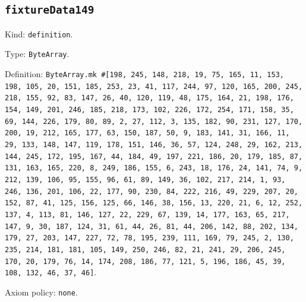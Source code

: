 \documentclass[11pt]{article}
\begin{document}
\subsection*{\texttt{fixtureData149}}
\noindent Kind: \texttt{definition}.\par
\noindent Type: \texttt{ByteArray}.\par
\noindent Definition: \texttt{ByteArray.mk \#[198, 245, 148, 218, 19, 75, 165, 11, 153, 198, 105, 20, 151, 185, 253, 23, 41, 117, 244, 97, 120, 165, 200, 245, 218, 155, 92, 83, 147, 26, 40, 120, 119, 48, 175, 164, 21, 198, 176, 154, 149, 201, 246, 185, 218, 173, 102, 226, 172, 254, 171, 158, 35, 69, 144, 226, 179, 80, 89, 2, 27, 112, 3, 135, 182, 90, 231, 127, 170, 200, 19, 212, 165, 177, 63, 150, 187, 50, 9, 183, 141, 31, 166, 11, 29, 133, 148, 147, 119, 178, 151, 146, 36, 57, 124, 248, 29, 162, 213, 144, 245, 172, 195, 167, 44, 184, 49, 197, 221, 186, 20, 179, 185, 87, 131, 163, 165, 220, 8, 249, 186, 155, 6, 243, 18, 176, 24, 141, 74, 9, 212, 139, 106, 95, 155, 96, 61, 89, 149, 36, 102, 217, 214, 1, 93, 246, 136, 201, 106, 22, 177, 90, 230, 84, 222, 216, 49, 229, 207, 20, 152, 87, 41, 125, 156, 125, 66, 146, 38, 156, 13, 220, 21, 6, 12, 252, 137, 4, 113, 81, 146, 127, 22, 229, 67, 139, 14, 177, 163, 65, 217, 147, 9, 30, 187, 124, 31, 61, 44, 26, 81, 44, 206, 142, 88, 202, 134, 179, 27, 203, 147, 227, 72, 78, 195, 239, 111, 169, 79, 245, 2, 130, 235, 214, 181, 181, 105, 149, 250, 246, 82, 21, 241, 29, 206, 245, 170, 20, 179, 76, 14, 174, 208, 186, 77, 121, 5, 196, 186, 45, 39, 108, 132, 46, 37, 46]}.\par
\noindent Axiom policy: \texttt{none}.\par
\end{document}
